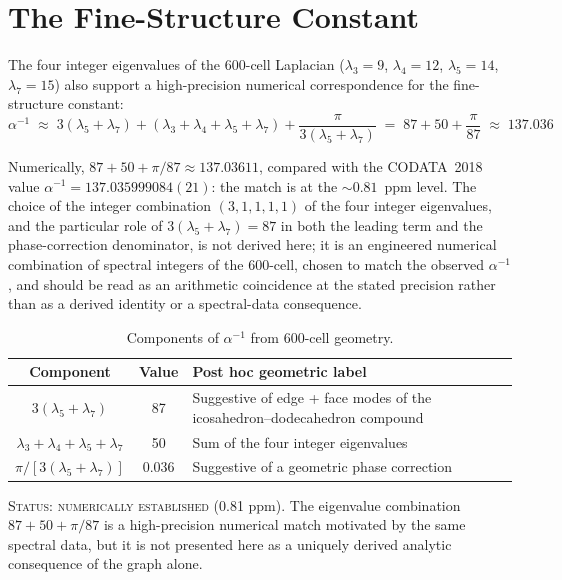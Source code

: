\documentclass[12pt]{article}
\begin{document}
\section{The Fine-Structure Constant}\label{sec:alpha}

The four integer eigenvalues of the 600-cell Laplacian ($\lambda_3 = 9$, $\lambda_4 = 12$, $\lambda_5 = 14$, $\lambda_7 = 15$) also support a high-precision numerical correspondence for the fine-structure constant:
\begin{equation}\label{eq:alpha}
    \alpha^{-1} \;\approx\; 3(\lambda_5 + \lambda_7) + (\lambda_3 + \lambda_4 + \lambda_5 + \lambda_7) + \frac{\pi}{3(\lambda_5 + \lambda_7)} \;=\; 87 + 50 + \frac{\pi}{87} \;\approx\; 137.036
\end{equation}

Numerically, $87 + 50 + \pi/87 \approx 137.03611$, compared with the CODATA~2018~\citep{CODATA2018} value $\alpha^{-1} = 137.035999084(21)$: the match is at the $\sim 0.81$~ppm level. The choice of the integer combination $(3,1,1,1,1)$ of the four integer eigenvalues, and the particular role of $3(\lambda_5 + \lambda_7) = 87$ in both the leading term and the phase-correction denominator, is not derived here; it is an engineered numerical combination of spectral integers of the 600-cell, chosen to match the observed $\alpha^{-1}$, and should be read as an arithmetic coincidence at the stated precision rather than as a derived identity or a spectral-data consequence.

\begin{table}[ht]
\centering
\caption{Components of $\alpha^{-1}$ from 600-cell geometry.}
\label{tab:alpha}
\begin{tabular}{@{}ccl@{}}
\toprule
Component & Value & Post hoc geometric label \\
\midrule
$3(\lambda_5 + \lambda_7)$ & 87 & Suggestive of edge + face modes of the icosahedron--dodecahedron compound \\
$\lambda_3 + \lambda_4 + \lambda_5 + \lambda_7$ & 50 & Sum of the four integer eigenvalues \\
$\pi / [3(\lambda_5 + \lambda_7)]$ & $0.036$ & Suggestive of a geometric phase correction \\
\bottomrule
\end{tabular}
\end{table}

\textsc{Status: numerically established} (0.81 ppm). The eigenvalue combination $87 + 50 + \pi/87$ is a high-precision numerical match motivated by the same spectral data, but it is not presented here as a uniquely derived analytic consequence of the graph alone.
\end{document}
